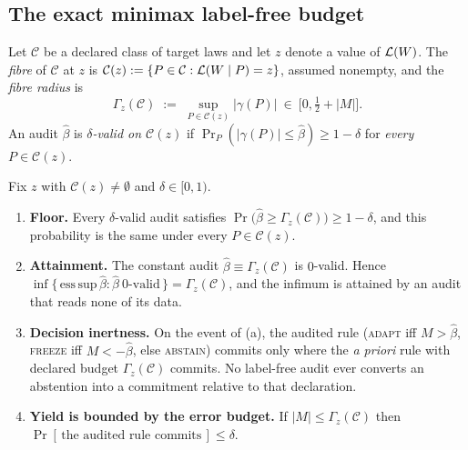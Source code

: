 \subsection{The exact minimax label-free budget}

\begin{definition}\label{def:fibre-radius}
Let $\mathcal C$ be a declared class of target laws and let $z$ denote a value of
$\mathcal{L}(W)$. The \emph{fibre} of $\mathcal C$ at $z$ is
$\mathcal C(z):=\{P\in\mathcal C:\mathcal{L}(W\mid P)=z\}$, assumed nonempty, and the \emph{fibre
radius} is
\[
\Gamma_z(\mathcal C)\;:=\;\sup_{P\in\mathcal C(z)}|\gamma(P)|\ \in\ \bigl[0,\tfrac12+|M|\bigr].
\]
An audit $\widehat\beta$ is \emph{$\delta$-valid on $\mathcal C(z)$} if
$\Pr_P(|\gamma(P)|\le\widehat\beta)\ge1-\delta$ for \emph{every} $P\in\mathcal C(z)$.
\end{definition}

\begin{theorem}\label{thm:beta-minimax}
Fix $z$ with $\mathcal C(z)\neq\emptyset$ and $\delta\in[0,1)$.
\begin{enumerate}
\item[\textnormal{(a)}]\textbf{Floor.} Every $\delta$-valid audit satisfies
$\Pr\bigl(\widehat\beta\ge\Gamma_z(\mathcal C)\bigr)\ge1-\delta$, and this probability is the
same under every $P\in\mathcal C(z)$.
\item[\textnormal{(b)}]\textbf{Attainment.} The constant audit
$\widehat\beta\equiv\Gamma_z(\mathcal C)$ is $0$-valid. Hence
$\inf\{\,\mathrm{ess\,sup}\,\widehat\beta:\widehat\beta\ \text{$0$-valid}\,\}=\Gamma_z(\mathcal C)$,
and the infimum is attained by an audit that reads none of its data.
\item[\textnormal{(c)}]\textbf{Decision inertness.} On the event of (a), the audited rule
(\textsc{adapt} iff $M>\widehat\beta$, \textsc{freeze} iff $M<-\widehat\beta$, else
\textsc{abstain}) commits only where the \emph{a priori} rule with declared budget
$\Gamma_z(\mathcal C)$ commits. No label-free audit ever converts an abstention into a
commitment relative to that declaration.
\item[\textnormal{(d)}]\textbf{Yield is bounded by the error budget.} If
$|M|\le\Gamma_z(\mathcal C)$ then $\Pr[\,\text{the audited rule commits}\,]\le\delta$.
\end{enumerate}
\end{theorem}

